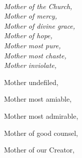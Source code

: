 
~\phantom{TAB}~\phantom{TAB}~\phantom{TAB}~~~~\phantom{TAB}~\begin{minipage}[t][1ex][t]{5cm}
\itshape
Mother of the Church,\\
Mother of mercy,\\ Mother of divine grace,\\ Mother of hope,\\
Mother most pure,\\ Mother most chaste,\\ Mother inviolate,

Mother undefiled,

Mother most amiable,

Mother most admirable,

Mother of good counsel,

Mother of our Creator,

\end{minipage}


